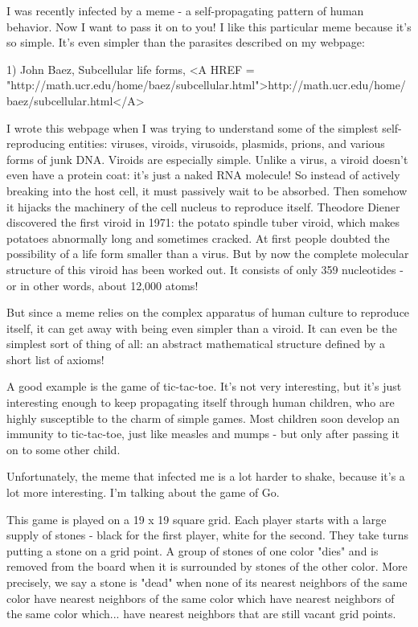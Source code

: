 

I was recently infected by a meme - a self-propagating pattern of human 
behavior.  Now I want to pass it on to you!  I like this particular meme 
because it's so simple.  It's even simpler than the parasites described 
on my webpage:

1) John Baez, Subcellular life forms,
<A HREF = "http://math.ucr.edu/home/baez/subcellular.html">http://math.ucr.edu/home/baez/subcellular.html</A>

I wrote this webpage when I was trying to understand some of the
simplest self-reproducing entities: viruses, viroids, virusoids,
plasmids, prions, and various forms of junk DNA.  Viroids are 
especially simple.  Unlike a virus, a viroid doesn't even have a protein
coat: it's just a naked RNA molecule!  So instead of actively breaking
into the host cell, it must passively wait to be absorbed.  Then somehow
it hijacks the machinery of the cell nucleus to reproduce itself.  
Theodore Diener discovered the first viroid in 1971:  the potato spindle
tuber viroid, which makes potatoes abnormally long and sometimes
cracked.   At first people doubted the possibility of a life form
smaller than a virus.  But by now the complete molecular structure of
this viroid has been worked out.  It consists of only 359 nucleotides -
or in other words, about 12,000 atoms!  

But since a meme relies on the complex apparatus of human culture to 
reproduce itself, it can get away with being even simpler than a   
viroid.  It can even be the simplest sort of thing of all: an abstract
mathematical structure defined by a short list of axioms!

A good example is the game of tic-tac-toe.  It's not very interesting,
but it's just interesting enough to keep propagating itself through
human children, who are highly susceptible to the charm of simple games.
Most children soon develop an immunity to tic-tac-toe, just like 
measles and mumps - but only after passing it on to some other child.

Unfortunately, the meme that infected me is a lot harder to shake,
because it's a lot more interesting.  I'm talking about the game of
Go.  

This game is played on a 19 x 19 square grid.  Each player starts with a
large supply of stones - black for the first player, white for the
second.  They take turns putting a stone on a grid point.  A group of
stones of one color "dies" and is removed from the board when it is
surrounded by stones of the other color.  More precisely, we say a stone
is "dead" when none of its nearest neighbors of the same color have
nearest neighbors of the same color which have nearest neighbors of the
same color which... have nearest neighbors that are still vacant grid
points.

